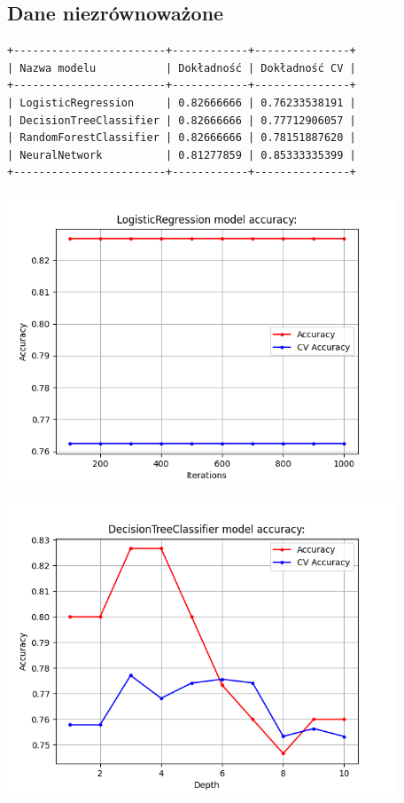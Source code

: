 \documentclass[11pt, a4paper, notitlepage]{report}
\begin{document}
\subsection{Dane niezrównoważone}

\begin{verbatim}
+------------------------+------------+---------------+
| Nazwa modelu           | Dokładność | Dokładność CV |
+------------------------+------------+---------------+
| LogisticRegression     | 0.82666666 | 0.76233538191 |
| DecisionTreeClassifier | 0.82666666 | 0.77712906057 |
| RandomForestClassifier | 0.82666666 | 0.78151887620 |
| NeuralNetwork          | 0.81277859 | 0.85333335399 |
+------------------------+------------+---------------+
\end{verbatim}


\begin{center}

\includegraphics[width=330pt]{graphics/LogisticRegression_1}

\includegraphics[width=330pt]{graphics/DecisionTreeClassifier_1}


\end{center}
\end{document}
